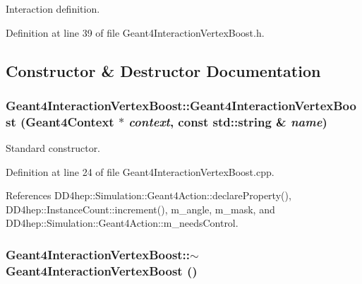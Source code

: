 Interaction definition. 

Definition at line 39 of file Geant4InteractionVertexBoost.h.

\subsection{Constructor \& Destructor Documentation}
\hypertarget{class_d_d4hep_1_1_simulation_1_1_geant4_interaction_vertex_boost_a244dd1d7ef8eee7b9ee8a40a09a1963d}{
\subsubsection[{Geant4InteractionVertexBoost}]{\setlength{\rightskip}{0pt plus 5cm}Geant4InteractionVertexBoost::Geant4InteractionVertexBoost ({\bf Geant4Context} $\ast$ {\em context}, \/  const std::string \& {\em name})}}
\label{class_d_d4hep_1_1_simulation_1_1_geant4_interaction_vertex_boost_a244dd1d7ef8eee7b9ee8a40a09a1963d}


Standard constructor. 

Definition at line 24 of file Geant4InteractionVertexBoost.cpp.

References DD4hep::Simulation::Geant4Action::declareProperty(), DD4hep::InstanceCount::increment(), m\_\-angle, m\_\-mask, and DD4hep::Simulation::Geant4Action::m\_\-needsControl.\hypertarget{class_d_d4hep_1_1_simulation_1_1_geant4_interaction_vertex_boost_a06fa61bb33bf2286f1abb7b0af507b77}{
\subsubsection[{$\sim$Geant4InteractionVertexBoost}]{\setlength{\rightskip}{0pt plus 5cm}Geant4InteractionVertexBoost::$\sim$Geant4InteractionVertexBoost ()}}
\label{class_d_d4hep_1_1_simulation_1_1_geant4_interaction_vertex_boost_a06fa61bb33bf2286f1abb7b0af507b77}


